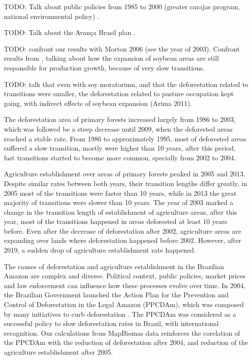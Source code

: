 \documentclass[essd, manuscript]{copernicus}
\begin{document}
TODO: Talk about public policies from 1985 to 2000 (greater carajas program, national environmental policy) \citep{Banerjee2009}.

TODO: Talk about the Avança Brasil plan \citep{Carvalho2002, Banerjee2009}.

TODO: confront our results with Morton 2006 (see the year of 2003).
Confront results from \citep{Macedo2012}, talking about how the expansion of soybean areas are still responsible for production growth, because of very slow transitions.

TODO: talk that even with soy moratorium, and that the deforestation related to transitions were smaller, the deforestation related to pasture occupation kept going, with indirect effects of soybean expansion (Arima 2011).

The deforestation area of primary forests increased largely from 1986 to 2003, which was followed be a steep decrease until 2009, when the deforested areas reached a stable rate.
From 1986 to approximately 1995, most of deforested areas suffered a slow transition, mostly were higher than 10 years, after this period, fast transitions started to become more common, specially from 2002 to 2004.

Agriculture establishment over areas of primary forests peaked in 2005 and 2013.
Despite similar rates between both years, their transition lengths differ greatly, in 2005 most of the transitions were faster than 10 years, while in 2013 the great majority of transitions were slower than 10 years.
The year of 2003 marked a change in the transition length of establishment of agriculture areas, after this year, most of the transitions happened in areas deforested at least 10 years before.
Even after the decrease of deforestation after 2002, agriculture areas are expanding over lands where deforestation happened before 2002.
However, after 2019, a sudden drop of agriculture establishment rate happened.

The causes of deforestation and agriculture establishment in the Brazilian Amazon are complex and diverse.
Political context, public policies, market prices and law enforcement can influence how these processes evolve over time.
In 2004, the Brazilian Government launched the Action Plan for the Prevention and Control of Deforestation in the Legal Amazon (PPCDAm), which was composed by many initiatives to curb deforestation \citep{West2021}.
The PPCDAm was considered as a successful policy to slow deforestation rates in Brazil, with international recognition.
Our calculations from MapBiomas data reinforces the corelation of the PPCDAm with the reduction of deforestation after 2004, and reduction of the agriculture establishment after 2005.
\end{document}
